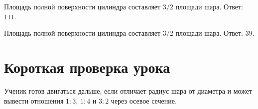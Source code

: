 {Площадь полной поверхности цилиндра составляет \(3/2\) площади шара. Ответ: \(111\).}

{Площадь полной поверхности цилиндра составляет \(3/2\) площади шара. Ответ: \(39\).}

\ifteacher
\section*{Короткая проверка урока}
Ученик готов двигаться дальше, если отличает радиус шара от диаметра и может
вывести отношения \(1:3\), \(1:4\) и \(3:2\) через осевое сечение.
\fi

